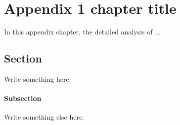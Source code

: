 \chapter{Appendix 1 chapter title}
\label{app:appx1}

In this appendix chapter, the detailed analysis of ...

\section{Section}
\label{appxSec}
Write something here.

\subsubsection{Subsection}
Write something else here.